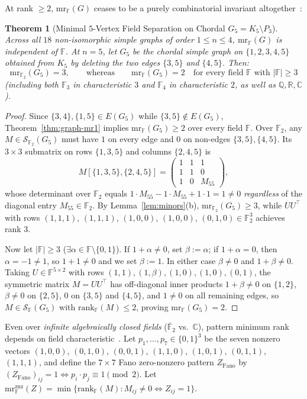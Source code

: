 \documentclass[11pt]{article}
\newtheorem{theorem}{Theorem}[section]
\theoremstyle{definition}
\newcommand{\F}{\mathbb{F}}
\newcommand{\Q}{\mathbb{Q}}
\newcommand{\R}{\mathbb{R}}
\newcommand{\C}{\mathbb{C}}
\newcommand{\mr}{\mathrm{mr}}
\newcommand{\rk}{\mathrm{rank}}
\begin{document}
At rank $\ge 2$, $\mr_{\F}(G)$ ceases to be a purely combinatorial invariant altogether~\cite{BF2004,FH2007}:

\begin{theorem}[Minimal $5$-Vertex Field Separation on Chordal $G_5 = K_5 \setminus P_3$]\label{thm:g5}
Across all $18$ non-isomorphic simple graphs of order $1 \le n \le 4$, $\mr_{\F}(G)$ is independent of $\F$. At $n = 5$, let $G_5$ be the chordal simple graph on $\{1,2,3,4,5\}$ obtained from $K_5$ by deleting the two edges $\{3,5\}$ and $\{4,5\}$. Then:
\[
\mr_{\F_2}(G_5) = 3, \qquad \text{whereas} \qquad \mr_{\F}(G_5) = 2 \quad \text{for every field } \F \text{ with } |\F| \ge 3
\]
(including both $\F_3$ in characteristic $3$ and $\F_4$ in characteristic $2$, as well as $\Q,\R,\C$).
\end{theorem}
\begin{proof}
Since $\{3,4\}, \{1,5\} \in E(G_5)$ while $\{3,5\}\notin E(G_5)$, Theorem~\ref{thm:graph-mr1} implies $\mr_{\F}(G_5) \ge 2$ over every field $\F$.
Over $\F_2$, any $M \in \mathcal{S}_{\F_2}(G_5)$ must have $1$ on every edge and $0$ on non-edges $\{3,5\},\{4,5\}$. Its $3\times 3$ submatrix on rows $\{1,3,5\}$ and columns $\{2,4,5\}$ is
\[
M[\{1,3,5\},\{2,4,5\}] = \begin{pmatrix} 1 & 1 & 1 \\ 1 & 1 & 0 \\ 1 & 0 & M_{55} \end{pmatrix},
\]
whose determinant over $\F_2$ equals $1\cdot M_{55} - 1\cdot M_{55} + 1\cdot 1 = 1 \neq 0$ \emph{regardless} of the diagonal entry $M_{55} \in \F_2$. By Lemma~\ref{lem:minors}(b), $\mr_{\F_2}(G_5) \ge 3$, while $U U^\top$ with rows $(1,1,1)$, $(1,1,1)$, $(1,0,0)$, $(1,0,0)$, $(0,1,0) \in \F_2^3$ achieves rank $3$.

Now let $|\F| \ge 3$ ($\exists \alpha \in \F \setminus \{0,1\}$). If $1+\alpha \neq 0$, set $\beta := \alpha$; if $1+\alpha = 0$, then $\alpha = -1 \neq 1$, so $1+1 \neq 0$ and we set $\beta := 1$. In either case $\beta \neq 0$ and $1+\beta \neq 0$. Taking $U \in \F^{5\times 2}$ with rows $(1,1), (1,\beta), (1,0), (1,0), (0,1)$, the symmetric matrix $M = U U^\top$ has off-diagonal inner products $1+\beta \neq 0$ on $\{1,2\}$, $\beta \neq 0$ on $\{2,5\}$, $0$ on $\{3,5\}$ and $\{4,5\}$, and $1\neq 0$ on all remaining edges, so $M \in \mathcal{S}_{\F}(G_5)$ with $\rk_{\F}(M) \le 2$, proving $\mr_{\F}(G_5) = 2$.
\end{proof}

Even over \emph{infinite algebraically closed fields} ($\overline{\F}_2$ vs.\ $\C$), pattern minimum rank depends on field characteristic~\cite{BFHRS2008}. Let $p_1,\dots,p_7 \in \{0,1\}^3$ be the seven nonzero vectors $(1,0,0)$, $(0,1,0)$, $(0,0,1)$, $(1,1,0)$, $(1,0,1)$, $(0,1,1)$, $(1,1,1)$, and define the $7\times 7$ Fano zero-nonzero pattern $Z_{\mathrm{Fano}}$ by $(Z_{\mathrm{Fano}})_{ij} = 1 \iff p_i \cdot p_j \equiv 1 \pmod 2$. Let $\mr_{\F}^{\mathrm{znz}}(Z) = \min\{\rk_{\F}(M) : M_{ij}\neq 0 \iff Z_{ij}=1\}$.
\end{document}
